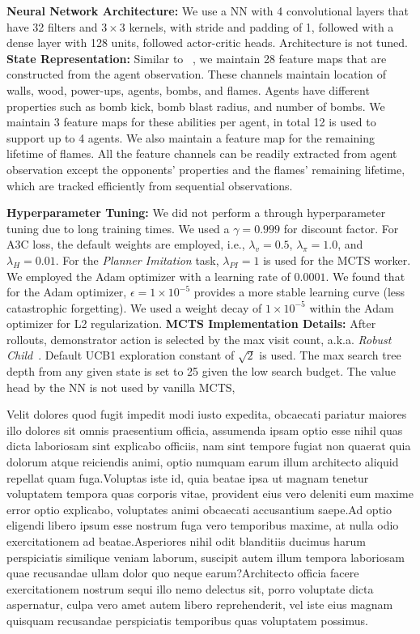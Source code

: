 \documentclass[letterpaper]{article}
\begin{document}
\textbf{Neural Network Architecture:} We use a NN with 4 convolutional layers that have 32 filters and $3 \times 3$ kernels, with stride and padding of 1, followed with a dense layer with 128 units, followed actor-critic heads. Architecture is not tuned.  \textbf{State Representation:} Similar to ~\cite{resnick2018pommerman}, we maintain 28 feature maps that are constructed from the agent observation. These channels maintain location of walls, wood, power-ups, agents, bombs, and flames. Agents have different properties such as bomb kick, bomb blast radius, and number of bombs. We maintain 3 feature maps for these abilities per agent, in total 12 is used to support up to 4 agents. We also maintain a feature map for the remaining lifetime of flames. All the feature channels can be readily extracted from agent observation except the opponents' properties and the flames' remaining lifetime, which are tracked efficiently from sequential observations.

\textbf{Hyperparameter Tuning:} We did not perform a through hyperparameter tuning due to long training times. We used a $\gamma=0.999$ for discount factor. For A3C loss, the default weights are employed, i.e., $\lambda_{v}=0.5$, $\lambda_{\pi}=1.0$, and $\lambda_{H}=0.01$. For the \emph{Planner Imitation} task, $\lambda_{PI}=1$ is used for the MCTS worker. We employed the Adam optimizer with a learning rate of $0.0001$. We found that for the Adam optimizer, $\epsilon = 1\times10^{-5}$ provides a more stable learning curve (less catastrophic forgetting). We used a weight decay of $1\times10^{-5}$ within the Adam optimizer for L2 regularization.  \textbf{MCTS Implementation Details:} After rollouts, demonstrator action is selected by the max visit count, a.k.a. \textit{Robust Child}~\cite{browne2012survey}. Default UCB1 exploration constant of $\sqrt{2}$ is used. The max search tree depth from any given state is set to 25 given the low search budget. The value head by the NN is not used by vanilla MCTS, %



\small  Velit dolores quod fugit impedit modi iusto expedita, obcaecati pariatur maiores illo dolores sit omnis praesentium officia, assumenda ipsam optio esse nihil quas dicta laboriosam sint explicabo officiis, nam sint tempore fugiat non quaerat quia dolorum atque reiciendis animi, optio numquam earum illum architecto aliquid repellat quam fuga.Voluptas iste id, quia beatae ipsa ut magnam tenetur voluptatem tempora quas corporis vitae, provident eius vero deleniti eum maxime error optio explicabo, voluptates animi obcaecati accusantium saepe.Ad optio eligendi libero ipsum esse nostrum fuga vero temporibus maxime, at nulla odio exercitationem ad beatae.Asperiores nihil odit blanditiis ducimus harum perspiciatis similique veniam laborum, suscipit autem illum tempora laboriosam quae recusandae ullam dolor quo neque earum?Architecto officia facere exercitationem nostrum sequi illo nemo delectus sit, porro voluptate dicta aspernatur, culpa vero amet autem libero reprehenderit, vel iste eius magnam quisquam recusandae perspiciatis temporibus quas voluptatem possimus.\clearpage

\end{document}
